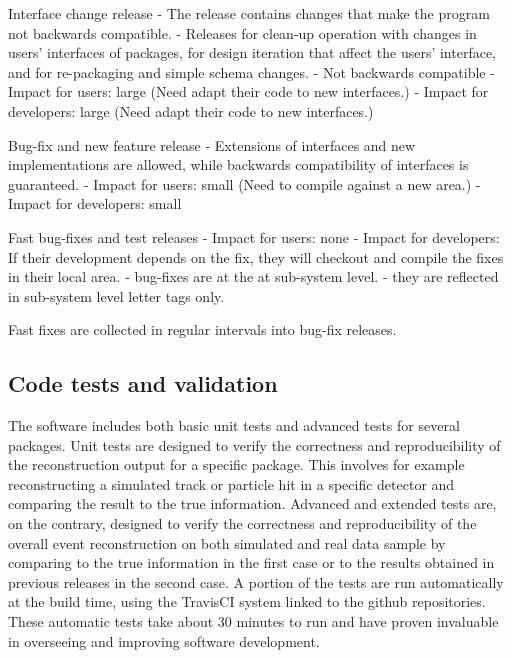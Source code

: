 \documentclass[3p,times,twocolumn]{elsarticle}
\begin{document}
Interface change release
- The release contains changes that make the program not backwards compatible.
- Releases for clean-up operation with changes in users' interfaces of
packages, for design iteration that affect the users' interface, and
for re-packaging and simple schema changes.
- Not backwards compatible
- Impact for users: large (Need adapt their code to new interfaces.)
- Impact for developers: large (Need adapt their code to new interfaces.)

Bug-fix and new feature release
- Extensions of interfaces and new implementations are allowed, while
backwards compatibility of interfaces is guaranteed.
- Impact for users: small (Need to compile against a new area.)
- Impact for developers: small

Fast bug-fixes and test releases
- Impact for users: none
- Impact for developers: If their development depends on the fix, they will checkout
and compile the fixes in their local area.
- bug-fixes are at the at sub-system level.
- they are reflected in sub-system level letter tags only.

Fast fixes are collected in regular intervals into bug-fix releases.

\subsection{Code tests and validation}\label{sec:tests}
The software includes both basic unit tests and advanced tests for several packages. Unit tests are designed to verify the correctness and reproducibility of the reconstruction output for a specific package. This involves for example reconstructing a simulated track or particle hit in a specific detector and comparing the result to the true information. Advanced and extended tests are, on the contrary, designed to verify the correctness and reproducibility of the overall event reconstruction on both simulated and real data sample by comparing to the true information in the first case or to the results obtained in previous releases in the second case. A portion of the tests are run automatically at the build time, using the TravisCI system linked to the github repositories.  These automatic tests take about 30 minutes to run and have proven invaluable in overseeing and improving software development.
\end{document}
